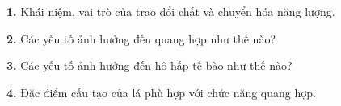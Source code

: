 \documentclass[13pt,a4paper]{article}
\begin{document}
\textbf{1.} Khái niệm, vai trò của trao đổi chất và chuyển hóa năng lượng.
\par\vspace{1pt}\noindent\dotfill\par\vspace{4pt}\noindent\dotfill\par\vspace{4pt}\noindent\dotfill\par\vspace{4pt}\noindent\dotfill\par\vspace{4pt}\noindent\dotfill\par\vspace{4pt}\noindent\dotfill\par\vspace{4pt}\noindent
\textbf{2.} Các yếu tố ảnh hưởng đến quang hợp như thế nào?
\par\vspace{1pt}\noindent\dotfill\par\vspace{4pt}\noindent\dotfill\par\vspace{4pt}\noindent\dotfill\par\vspace{4pt}\noindent\dotfill\par\vspace{4pt}\noindent\dotfill\par\vspace{4pt}\noindent\dotfill\par\vspace{4pt}\noindent
\textbf{3.} Các yếu tố ảnh hưởng đến hô hấp tế bào như thế nào?
\par\vspace{1pt}\noindent\dotfill\par\vspace{4pt}\noindent\dotfill\par\vspace{4pt}\noindent\dotfill\par\vspace{4pt}\noindent\dotfill\par\vspace{4pt}\noindent\dotfill\par\vspace{4pt}\noindent\dotfill\par\vspace{4pt}\noindent
\textbf{4.} Đặc điểm cấu tạo của lá phù hợp với chức năng quang hợp.
\end{document}
